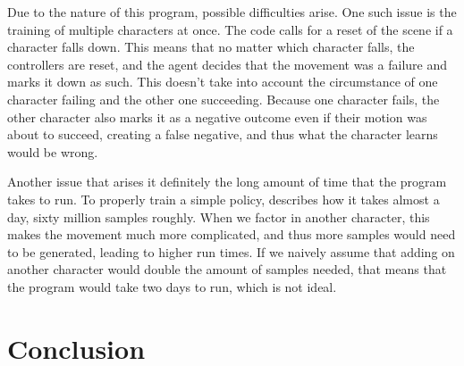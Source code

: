 \documentclass{l4proj}
\begin{document}
Due to the nature of this program, possible difficulties arise. One such issue is the training of multiple characters at once. The code calls for a reset of the scene if a character falls down. This means that no matter which character falls, the controllers are reset, and the agent decides that the movement was a failure and marks it down as such. This doesn't take into account the circumstance of one character failing and the other one succeeding. Because one character fails, the other character also marks it as a negative outcome even if their motion was about to succeed, creating a false negative, and thus what the character learns would be wrong.

Another issue that arises it definitely the long amount of time that the program takes to run. To properly train a simple policy, \cite{deepmimic} describes how it takes almost a day, sixty million samples roughly. When we factor in another character, this makes the movement much more complicated, and thus more samples would need to be generated, leading to higher run times. If we naively assume that adding on another character would double the amount of samples needed, that means that the program would take two days to run, which is not ideal.


\chapter{Conclusion}    
\end{document}

